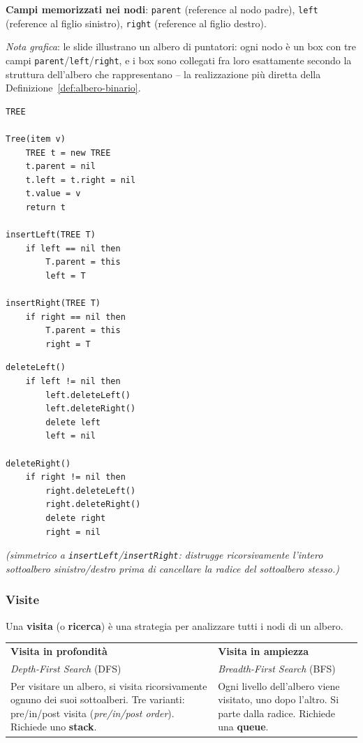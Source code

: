 \documentclass[12pt, a4paper]{article}
\begin{document}
\textbf{Campi memorizzati nei nodi}: \texttt{parent} (reference al nodo padre), \texttt{left} (reference al figlio sinistro), \texttt{right} (reference al figlio destro).

\textit{Nota grafica}: le slide illustrano un albero di puntatori: ogni nodo è un box con tre campi \texttt{parent}/\texttt{left}/\texttt{right}, e i box sono collegati fra loro esattamente secondo la struttura dell'albero che rappresentano -- la realizzazione più diretta della Definizione~\ref{def:albero-binario}.

\begin{verbatim}
TREE

Tree(item v)
    TREE t = new TREE
    t.parent = nil
    t.left = t.right = nil
    t.value = v
    return t

insertLeft(TREE T)
    if left == nil then
        T.parent = this
        left = T

insertRight(TREE T)
    if right == nil then
        T.parent = this
        right = T
\end{verbatim}


\begin{verbatim}
deleteLeft()
    if left != nil then
        left.deleteLeft()
        left.deleteRight()
        delete left
        left = nil

deleteRight()
    if right != nil then
        right.deleteLeft()
        right.deleteRight()
        delete right
        right = nil
\end{verbatim}
\textit{(simmetrico a \texttt{insertLeft}/\texttt{insertRight}: distrugge ricorsivamente l'intero sottoalbero sinistro/destro prima di cancellare la radice del sottoalbero stesso.)}

\subsubsection{Visite}

\begin{tcolorbox}[colback=lightergray!10, colframe=tocsec, title=\textbf{Definizione: Visita di un Albero}]
\label{def:visita-albero}
Una \textbf{visita} (o \textbf{ricerca}) è una strategia per analizzare tutti i nodi di un albero.
\end{tcolorbox}

\begin{center}
\begin{tabular}{p{6.5cm}p{6.5cm}}
\toprule
\textbf{Visita in profondità} & \textbf{Visita in ampiezza} \\
\textit{Depth-First Search} (DFS) & \textit{Breadth-First Search} (BFS) \\
\midrule
Per visitare un albero, si visita ricorsivamente ognuno dei suoi sottoalberi. Tre varianti: pre/in/post visita (\textit{pre/in/post order}). Richiede uno \textbf{stack}. & Ogni livello dell'albero viene visitato, uno dopo l'altro. Si parte dalla radice. Richiede una \textbf{queue}. \\
\bottomrule
\end{tabular}
\end{center}
\end{document}
